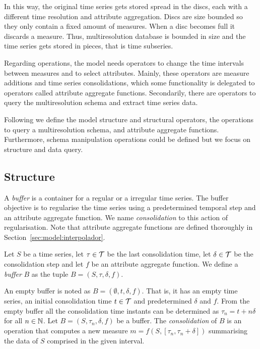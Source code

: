 In this way, the original time series gets stored spread in the discs,
each with a different time resolution and attribute aggregation.
Discs are size bounded so they only contain a fixed amount of
measures. When a disc becomes full it discards a measure. Thus,
multiresolution database is bounded in size and the time series gets
stored in pieces, that is time subseries.

Regarding operations, the  model needs operators to change
the time intervals between measures and to select attributes. Mainly,
these operators are measure additions and time series consolidations,
which some functionality is delegated to operators called attribute
aggregate functions. Secondarily, there are operators to query the
multiresolution schema and extract time series data.

Following we define the  model structure and structural
operators, the operations to query a multiresolution schema, and
attribute aggregate functions.  Furthermore, schema manipulation
operations could be defined but we focus on structure and data query.



\subsection{Structure}

A \emph{buffer} is a container for a regular or a irregular time
series. The buffer objective is to regularise the time series using a
predetermined temporal step and an attribute aggregate function.  We
name \emph{consolidation} to this action of regularisation.  Note that
attribute aggregate functions are defined thoroughly in
Section~\ref{sec:model:interpolador}.

\begin{definition}[Buffer]
  Let $S$ be a time series, let $\tau\in\cal{T}$ be the last
  consolidation time, let $\delta\in\cal{T}$ be the consolidation step
  and let $f$ be an attribute aggregate function. We define a
  \emph{buffer} $B$ as the tuple $B=(S,\tau,\delta,f)$.
\end{definition}

An empty buffer is noted as $B = (\emptyset, t, \delta, f)$. That is,
it has an empty time series, an initial consolidation time
$t\in\cal{T}$ and predetermined $\delta$ and $f$.  From the empty
buffer all the consolidation time instants can be determined as
$\tau_n=t+n\delta$ for all $n\in\mathbb{N}$. 
Let $B=(S,\tau_n,\delta,f)$ be a buffer. The \emph{consolidation} of
$B$ is an operation that computes a new measure
$m=f(S,[\tau_n,\tau_n+\delta])$ summarising the data of $S$ comprised
in the given interval.
%

